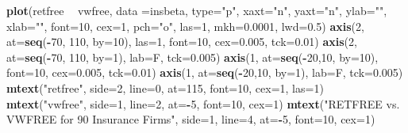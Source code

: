 \documentclass[]{book}
\newenvironment{Shaded}{\begin{snugshade}}{\end{snugshade}}
\newcommand{\DataTypeTok}[1]{\textcolor[rgb]{0.13,0.29,0.53}{#1}}
\newcommand{\DecValTok}[1]{\textcolor[rgb]{0.00,0.00,0.81}{#1}}
\newcommand{\FloatTok}[1]{\textcolor[rgb]{0.00,0.00,0.81}{#1}}
\newcommand{\KeywordTok}[1]{\textcolor[rgb]{0.13,0.29,0.53}{\textbf{#1}}}
\newcommand{\NormalTok}[1]{#1}
\newcommand{\OperatorTok}[1]{\textcolor[rgb]{0.81,0.36,0.00}{\textbf{#1}}}
\newcommand{\StringTok}[1]{\textcolor[rgb]{0.31,0.60,0.02}{#1}}
\begin{document}
\begin{Shaded}
\begin{Highlighting}[]
\KeywordTok{plot}\NormalTok{(retfree }\OperatorTok{~}\StringTok{ }\NormalTok{vwfree, }\DataTypeTok{data =}\NormalTok{insbeta, }\DataTypeTok{type=}\StringTok{"p"}\NormalTok{, }\DataTypeTok{xaxt=}\StringTok{"n"}\NormalTok{, }\DataTypeTok{yaxt=}\StringTok{"n"}\NormalTok{, }\DataTypeTok{ylab=}\StringTok{""}\NormalTok{, }\DataTypeTok{xlab=}\StringTok{""}\NormalTok{, }\DataTypeTok{font=}\DecValTok{10}\NormalTok{, }\DataTypeTok{cex=}\DecValTok{1}\NormalTok{, }\DataTypeTok{pch=}\StringTok{"o"}\NormalTok{, }\DataTypeTok{las=}\DecValTok{1}\NormalTok{, }\DataTypeTok{mkh=}\FloatTok{0.0001}\NormalTok{, }\DataTypeTok{lwd=}\FloatTok{0.5}\NormalTok{)}
\KeywordTok{axis}\NormalTok{(}\DecValTok{2}\NormalTok{, }\DataTypeTok{at=}\KeywordTok{seq}\NormalTok{(}\OperatorTok{-}\DecValTok{70}\NormalTok{, }\DecValTok{110}\NormalTok{, }\DataTypeTok{by=}\DecValTok{10}\NormalTok{), }\DataTypeTok{las=}\DecValTok{1}\NormalTok{, }\DataTypeTok{font=}\DecValTok{10}\NormalTok{, }\DataTypeTok{cex=}\FloatTok{0.005}\NormalTok{, }\DataTypeTok{tck=}\FloatTok{0.01}\NormalTok{)}
\KeywordTok{axis}\NormalTok{(}\DecValTok{2}\NormalTok{, }\DataTypeTok{at=}\KeywordTok{seq}\NormalTok{(}\OperatorTok{-}\DecValTok{70}\NormalTok{, }\DecValTok{110}\NormalTok{, }\DataTypeTok{by=}\DecValTok{1}\NormalTok{), }\DataTypeTok{lab=}\NormalTok{F, }\DataTypeTok{tck=}\FloatTok{0.005}\NormalTok{)}
\KeywordTok{axis}\NormalTok{(}\DecValTok{1}\NormalTok{, }\DataTypeTok{at=}\KeywordTok{seq}\NormalTok{(}\OperatorTok{-}\DecValTok{20}\NormalTok{,}\DecValTok{10}\NormalTok{, }\DataTypeTok{by=}\DecValTok{10}\NormalTok{), }\DataTypeTok{font=}\DecValTok{10}\NormalTok{, }\DataTypeTok{cex=}\FloatTok{0.005}\NormalTok{, }\DataTypeTok{tck=}\FloatTok{0.01}\NormalTok{)}
\KeywordTok{axis}\NormalTok{(}\DecValTok{1}\NormalTok{, }\DataTypeTok{at=}\KeywordTok{seq}\NormalTok{(}\OperatorTok{-}\DecValTok{20}\NormalTok{,}\DecValTok{10}\NormalTok{, }\DataTypeTok{by=}\DecValTok{1}\NormalTok{), }\DataTypeTok{lab=}\NormalTok{F, }\DataTypeTok{tck=}\FloatTok{0.005}\NormalTok{)}
\KeywordTok{mtext}\NormalTok{(}\StringTok{"retfree"}\NormalTok{, }\DataTypeTok{side=}\DecValTok{2}\NormalTok{, }\DataTypeTok{line=}\DecValTok{0}\NormalTok{, }\DataTypeTok{at=}\DecValTok{115}\NormalTok{, }\DataTypeTok{font=}\DecValTok{10}\NormalTok{, }\DataTypeTok{cex=}\DecValTok{1}\NormalTok{, }\DataTypeTok{las=}\DecValTok{1}\NormalTok{)}
\KeywordTok{mtext}\NormalTok{(}\StringTok{"vwfree"}\NormalTok{, }\DataTypeTok{side=}\DecValTok{1}\NormalTok{, }\DataTypeTok{line=}\DecValTok{2}\NormalTok{, }\DataTypeTok{at=}\OperatorTok{-}\DecValTok{5}\NormalTok{, }\DataTypeTok{font=}\DecValTok{10}\NormalTok{, }\DataTypeTok{cex=}\DecValTok{1}\NormalTok{)}
\KeywordTok{mtext}\NormalTok{(}\StringTok{"RETFREE vs. VWFREE for 90 Insurance Firms"}\NormalTok{, }\DataTypeTok{side=}\DecValTok{1}\NormalTok{, }\DataTypeTok{line=}\DecValTok{4}\NormalTok{, }\DataTypeTok{at=}\OperatorTok{-}\DecValTok{5}\NormalTok{, }\DataTypeTok{font=}\DecValTok{10}\NormalTok{, }\DataTypeTok{cex=}\DecValTok{1}\NormalTok{)}
\end{Highlighting}
\end{Shaded}
\end{document}
